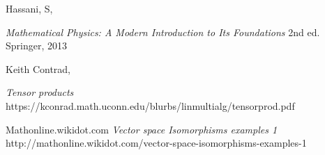 \documentclass[12pt,a4paper]{article}
\begin{document}
\newpage
\begin{thebibliography}{9}

  Hassani, S,

  \emph{Mathematical Physics: A Modern Introduction to Its Foundations}  2nd ed. Springer, 2013
 
  Keith Contrad,

  \emph{Tensor products}  https://kconrad.math.uconn.edu/blurbs/linmultialg/tensorprod.pdf

 Mathonline.wikidot.com
  \emph{Vector space Isomorphisms examples 1} http://mathonline.wikidot.com/vector-space-isomorphisms-examples-1


\end{thebibliography}
\end{document}
